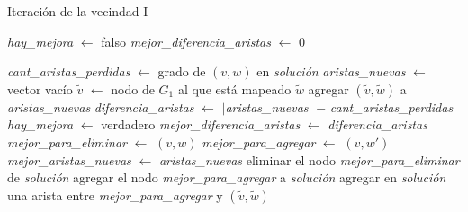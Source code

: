 
\begin{algorithm}[H]
    \SetAlgoVlined
    \caption{Iteración de la vecindad I}
    \textit{hay\_mejora} $\gets$ \textsf{falso} \;
    \textit{mejor\_diferencia\_aristas} $\gets$ 0 \;

     {
         {
            \textit{cant\_aristas\_perdidas} $\gets$ grado de $(v, w)$ en \textit{solución} \;
            \textit{aristas\_nuevas} $\gets$ vector vacío \;
             {
                 {
                    $\tilde{v}$ $\gets$ nodo de $G_1$ al que está mapeado $\tilde{w}$ \;
                     {
                        agregar $(\tilde{v}, \tilde{w})$ a \textit{aristas\_nuevas} \;
                    }
                }
            }
            \textit{diferencia\_aristas} $\gets$ $\vert$\textit{aristas\_nuevas}$\vert$
                $-$ \textit{cant\_aristas\_perdidas} \;
             {
                \textit{hay\_mejora} $\gets$ \textsf{verdadero} \;
                \textit{mejor\_diferencia\_aristas} $\gets$ \textit{diferencia\_aristas} \;
                \textit{mejor\_para\_eliminar} $\gets$ $(v, w)$ \;
                \textit{mejor\_para\_agregar} $\gets$ $(v, w')$ \;
                \textit{mejor\_aristas\_nuevas} $\gets$ \textit{aristas\_nuevas} \;
            }
        }
    }
     {
        eliminar el nodo \textit{mejor\_para\_eliminar} de \textit{solución} \;
        agregar el nodo \textit{mejor\_para\_agregar} a \textit{solución} \;
         {
            agregar en \textit{solución} una arista entre
                \textit{mejor\_para\_agregar} y $(\tilde{v}, \tilde{w})$ \;
        }
    } {
    }
\end{algorithm}

